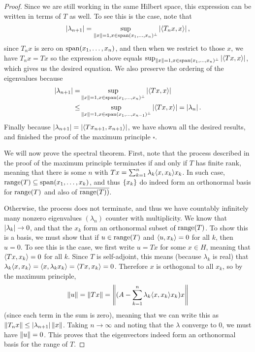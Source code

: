 \begin{proof}
Since we are still working in the same Hilbert space, this expression can be written in terms of $T$ as well.
To see this is the case, note that 
\begin{align*}
    \left\lvert \lambda_{n+1}\right\rvert
    = \sup_{\left\lVert x\right\rVert=1, x \in \operatorname*{span}(x_1, \dots, x_n)^\perp} \left\lvert \langle T_n x, x\rangle\right\rvert,
\end{align*}
since $T_n x$ is zero on $\operatorname*{span}(x_1, \dots, x_n)$, and then when we restrict to those $x$, we have $T_n x = Tx$ so the expression above equals $\sup_{\left\lVert x\right\rVert=1, x \in \operatorname*{span}(x_1, \dots, x_n)^\perp} \left\lvert \langle T x, x\rangle\right\rvert$, which gives us the desired equation.
We also preserve the ordering of the eigenvalues because 
\begin{align*}
    \left\lvert \lambda_{n+1}\right\rvert
    =& \sup_{\left\lVert x\right\rVert=1, x \in \operatorname*{span}(x_1, \dots, x_n)^\perp} \left\lvert \langle T x, x\rangle\right\rvert\\
    \leq& \sup_{\left\lVert x\right\rVert=1, x \in \operatorname*{span}(x_1, \dots, x_{n-1})^\perp} \left\lvert \langle T x, x\rangle\right\rvert
    =\left\lvert \lambda_n\right\rvert.
\end{align*}
Finally because $\left\lvert \lambda_{n+1}\right\rvert = \left\lvert \langle Tx_{n+1}, x_{n+1}\rangle\right\rvert$, we have shown all the desired results, and finished the proof of the maximum principle $\square$.

We will now prove the spectral theorem.
First, note that the process described in the proof of the maximum principle terminates if and only if $T$ has finite rank, meaning that there is some $n$ with $Tx = \sum_{k=1}^n \lambda_k \langle x, x_k\rangle x_k$.
In such case, $\operatorname*{range}(T) \subseteq \operatorname*{span}(x_1, \dots, x_k)$, and thus $\{x_k\}$ do indeed form an orthonormal basis for $\operatorname*{range}(T)$ and also of $\overline{\operatorname*{range}(T))}$.

Otherwise, the process does not terminate, and thus we have countably infinitely many nonzero eigenvalues $(\lambda_n)$ counter with multiplicity.
We know that $\left\lvert \lambda_k\right\rvert \to 0$, and that the $x_k$ form an orthonormal subset of $\operatorname*{range}(T)$.
To show this is a basis, we must show that if $u \in \operatorname*{range}(T)$ and $\langle u, x_k\rangle = 0$ for all $k$, then $u = 0$.
To see this is the case, we first write $u = Tx$ for some $x \in H$, meaning that $\langle Tx, x_k\rangle = 0$ for all $k$.
Since $T$ is self-adjoint, this means (because $\lambda_k$ is real) that $\lambda_k \langle x, x_k\rangle = \langle x, \lambda_k x_k\rangle = \langle Tx, x_k\rangle = 0$.
Therefore $x$ is orthogonal to all $x_k$, so by the maximum principle, 
\begin{align*}
    \left\lVert u\right\rVert 
    = \left\lVert Tx\right\rVert 
    = \left\lVert (A - \sum_{k=1}^n \lambda_k \langle x, x_k\rangle x_k) x\right\rVert
\end{align*}
(since each term in the sum is zero), meaning that we can write this as $\left\lVert T_n x\right\rVert \leq \left\lvert \lambda_{n+1}\right\rvert \left\lVert x\right\rVert$.
Taking $n \to \infty$ and noting that the $\lambda$ converge to 0, we must have $\left\lVert u\right\rVert = 0$.
This proves that the eigenvectors indeed form an orthonormal basis for the range of $T$.


\end{proof}
